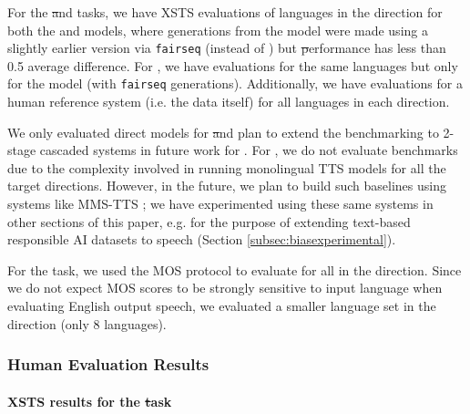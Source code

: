 For the \st and \sst tasks, we have XSTS evaluations of \evallangs{} languages in the \xeng direction for both the \mfourtlg and \whisperlarge models, where generations from the \mfourtlg model were made using a slightly earlier version via \texttt{fairseq} (instead of \fairseq) but \st performance has less than 0.5 \bleu average difference. For \engx, we have evaluations for the same languages but only for the \mfourtlg model (with \texttt{fairseq} generations). Additionally, we have evaluations for a human reference system (i.e. the \fleurs data itself) for all languages in each direction.

We only evaluated direct models for \st and plan to extend the benchmarking to 2-stage cascaded systems in future work for \engx. For \sst, we do not evaluate \engx benchmarks due to the complexity involved in running monolingual TTS models for all the target directions. However, in the future, we plan to build such baselines using systems like MMS-TTS \cite{mms}; we have experimented using these same systems in other sections of this paper, e.g. for the purpose of extending text-based responsible AI datasets to speech (Section \ref{subsec:biasexperimental}). 

For the \sst task, we used the MOS protocol to evaluate for all \evallangs{} in the \engx direction. Since we do not expect MOS scores to be strongly sensitive to input language when evaluating English output speech, we evaluated a smaller language set in the \xeng direction (only 8 languages).




\subsubsection{Human Evaluation Results}


\paragraph{XSTS results for the \st task} %

